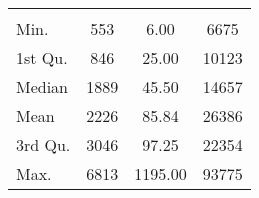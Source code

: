 \begin{tabular}{lS[table-format=5.1]S[table-format=5.1]S[table-format=5.1]}
&  &  &  \\
 Min.    & 553 & 6.00 & 6675 \\
 1st Qu. & 846 & 25.00 & 10123 \\
 Median  & 1889 & 45.50 & 14657 \\
 Mean    & 2226 & 85.84 & 26386 \\
 3rd Qu. & 3046 & 97.25 & 22354 \\
 Max.    & 6813 & 1195.00 & 93775 \\
\end{tabular}
